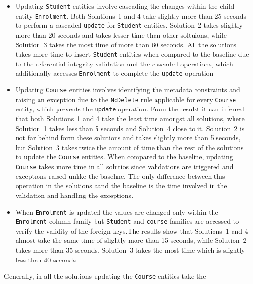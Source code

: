 	\begin{itemize}
	  \item Updating \texttt{Student} entities involve cascading the changes within the
	child entity \texttt{Enrolment}.
	Both Solutions~1 and 4 take slightly more than
	25 seconds to perform a cascaded \texttt{update} for \texttt{Student} entities.
	Solution~2 takes slightly more than 20 seconds and takes lesser time than other
	soltuions, while Solution~3 takes the most time of more than 60 seconds. All the
	solutions takes more time to insert \texttt{Student} entities when compared to
	the baseline due to the referential integrity validation and the cascaded
	operations, which additionally accesses \texttt{Enrolment} to complete the
	\texttt{update} operation.
	
	  \item Updating \texttt{Course} entities involves identifying the metadata
	constraints and raising an exception due to the \texttt{NoDelete} rule applicable for every
	\texttt{Course} entity, which prevents the \texttt{update} operation. From the
	resulst it can inferred that both Solutions~1 and 4 take the least time amongst
	all solutions, where Solution~1 takes less than 5 seconds and Solution~4
	close to it. Solution~2 is not far behind form these solutions and
	takes slightly more than 5 seconds, but Solution~3 takes twice the amount of
	time than the rest of the solutions to update the \texttt{Course} entities.
	When compared to the baseline, updating \texttt{Course} takes more time in all
	solutios since  validations are triggered and  exceptions raised unlike the
	baseline. The only difference between this operation in the solutions aand
	the baseline is the time involved in the validation and handling the
	exceptions.
	
	\item When \texttt{Enrolment} is updated the values are changed only within the
	\texttt{Enrolment} column family but \texttt{Student} and \texttt{course}
	families are accessed to verify the validity of the foreign keys.The results
	show that Solutions~1 and 4 almost take the same time of slightly more than 15
	seconds, while Solution~2 takes more than 35 seconds. Solution~3 takes the most
	time which is slightly less than 40 seconds. 
	\end{itemize}
Generally, in all the solutions updating the \texttt{Course} entities take the
